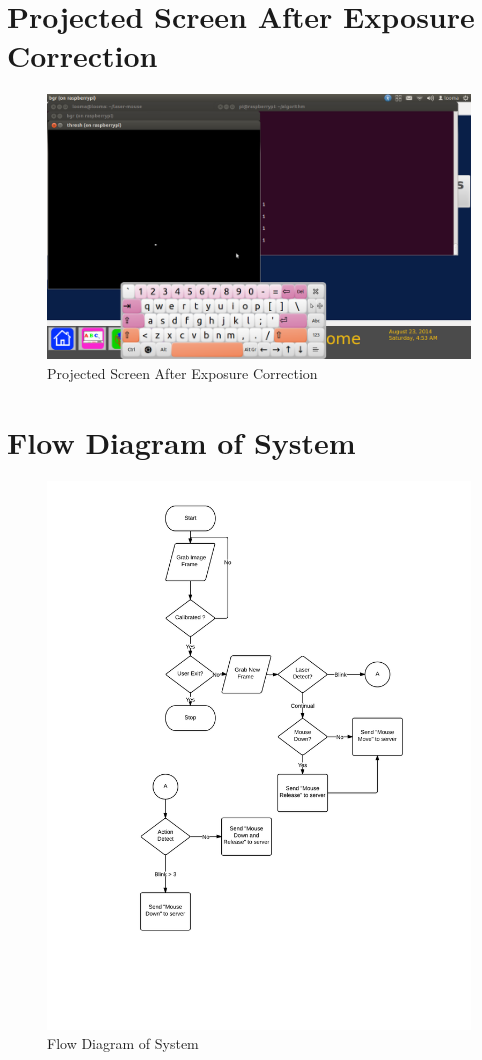 \documentclass[12pt, a4paper]{article}
\begin{document}
\section{Projected Screen After Exposure Correction}
\begin{figure}[htp]
\includegraphics[scale=0.30]{projectorwithout.png}
\caption{Projected Screen After Exposure Correction}
\label{}
\end{figure}
\newpage
\section{Flow Diagram of System}
\begin{figure}[htp]
\centering
\includegraphics[scale=0.62]{flow.png}
\caption{Flow Diagram of System}
\label{}
\end{figure}
\end{document}
